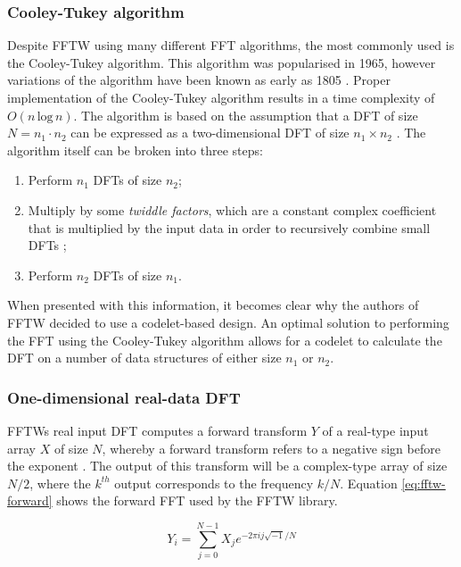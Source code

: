\documentclass[a4paper,11pt]{report}
\begin{document}
\subsubsection{Cooley-Tukey algorithm}
Despite FFTW using many different FFT algorithms, the most commonly used is the Cooley-Tukey algorithm. This algorithm was popularised in 1965, however variations of the algorithm have been known as early as 1805 \cite{cooley1965algorithm, heideman1985gauss}. Proper implementation of the Cooley-Tukey algorithm results in a time complexity of $O(n\, \textrm{log}\, n)$. The algorithm is based on the assumption that a DFT of size $N = n_{1} \cdot n_{2}$ can be expressed as a two-dimensional DFT of size $n_{1} \times n_{2}$ \cite{frigo2005design}. The algorithm itself can be broken into three steps: 

\begin{enumerate}
	\item Perform $n_{1}$ DFTs of size $n_{2}$;
	\item Multiply by some \textit{twiddle factors}, which are a constant complex coefficient that is multiplied by the input data in order to recursively combine small DFTs \cite{gentleman1966fast};
	\item Perform $n_{2}$ DFTs of size $n_{1}$.
\end{enumerate}

When presented with this information, it becomes clear why the authors of FFTW decided to use a codelet-based design. An optimal solution to performing the FFT using the Cooley-Tukey algorithm allows for a codelet to calculate the DFT on a number of data structures of either size $n_{1}$ or $n_{2}$.

\subsubsection{One-dimensional real-data DFT}
FFTWs real input DFT computes a forward transform $Y$ of a real-type input array $X$ of size $N$, whereby a forward transform refers to a negative sign before the exponent \cite{frigo2005design}. The output of this transform will be a complex-type array of size $N/2$, where the $k^{th}$ output corresponds to the frequency $k/N$. Equation \ref{eq:fftw-forward} shows the forward FFT used by the FFTW library.

\begin{equation}
Y _ { i } = \sum _ { j = 0 } ^ { N - 1 } X _ { j } e ^ { - 2 \pi i j \sqrt { - 1 } / N }
\label{eq:fftw-forward}
\end{equation}
\end{document}
